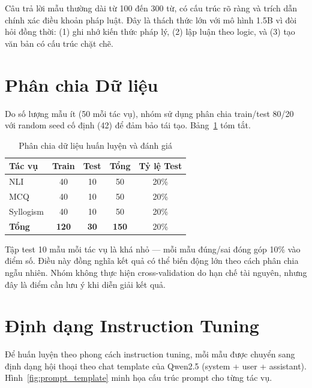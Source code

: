 \documentclass[fontsize=13pt,a4paper,oneside,DIV=calc,chapterprefix=true]{scrbook}
\begin{document}
Câu trả lời mẫu thường dài từ 100 đến 300 từ, có cấu trúc rõ ràng và trích dẫn chính xác điều
khoản pháp luật. Đây là thách thức lớn với mô hình 1.5B vì đòi hỏi đồng thời: (1) ghi nhớ
kiến thức pháp lý, (2) lập luận theo logic, và (3) tạo văn bản có cấu trúc chặt chẽ.

\section{Phân chia Dữ liệu}

Do số lượng mẫu ít (50 mỗi tác vụ), nhóm sử dụng phân chia train/test 80/20 với random seed
cố định (42) để đảm bảo tái tạo. Bảng~\ref{tab:split} tóm tắt.

\begin{table}[H]
\centering
\caption{Phân chia dữ liệu huấn luyện và đánh giá}
\label{tab:split}
\begin{tabular}{lcccc}
\toprule
\textbf{Tác vụ} & \textbf{Train} & \textbf{Test} & \textbf{Tổng} & \textbf{Tỷ lệ Test} \\
\midrule
NLI & 40 & 10 & 50 & 20\% \\
MCQ & 40 & 10 & 50 & 20\% \\
Syllogism & 40 & 10 & 50 & 20\% \\
\midrule
\textbf{Tổng} & \textbf{120} & \textbf{30} & \textbf{150} & 20\% \\
\bottomrule
\end{tabular}
\end{table}

Tập test 10 mẫu mỗi tác vụ là khá nhỏ --- mỗi mẫu đúng/sai đóng góp 10\% vào điểm số.
Điều này đồng nghĩa kết quả có thể biến động lớn theo cách phân chia ngẫu nhiên. Nhóm không
thực hiện cross-validation do hạn chế tài nguyên, nhưng đây là điểm cần lưu ý khi diễn giải
kết quả.

\section{Định dạng Instruction Tuning}

Để huấn luyện theo phong cách instruction tuning, mỗi mẫu được chuyển sang định dạng hội thoại
theo chat template của Qwen2.5 (system + user + assistant). Hình~\ref{fig:prompt_template} minh
họa cấu trúc prompt cho từng tác vụ.
\end{document}

